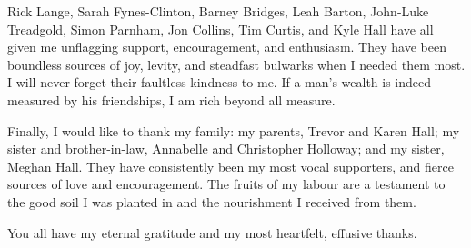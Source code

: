 \begin{acknowledgements}
{		Rick Lange, Sarah Fynes-Clinton, Barney Bridges, Leah Barton, 
		John-Luke Treadgold, Simon Parnham, Jon Collins, Tim Curtis, and 
		Kyle Hall have all given me unflagging support, encouragement, and 
		enthusiasm. They have been boundless sources of joy, levity, and 
		steadfast bulwarks when I needed them most. I will never forget 
		their faultless kindness to me. If a man's wealth is indeed 
		measured by his friendships, I am rich beyond all measure.
		
		Finally, I would like to thank my family: my parents, Trevor and 
		Karen Hall; my sister and brother-in-law, Annabelle and Christopher 
		Holloway; and my sister, Meghan Hall. They have consistently been 
		my most vocal supporters, and fierce sources of love and 
		encouragement. The fruits of my labour are a testament to the good
		soil I was planted in and the nourishment I received from them.
		
		You all have my eternal gratitude and my most heartfelt, effusive 
		thanks.}
	
\end{acknowledgements}